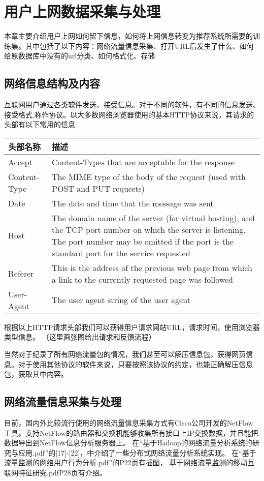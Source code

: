 \chapter{用户上网数据采集与处理}
本章主要介绍用户上网如何留下信息，如何将上网信息转变为推荐系统所需要的训练集。其中包括了以下内容：网络流量信息采集、打开URL后发生了什么、如何给原数据库中没有的url分类、如何格式化、存储
\section{网络信息结构及内容}
互联网用户通过各类软件发送、接受信息。对于不同的软件，有不同的信息发送、接受格式,称作协议。以大多数网络浏览器使用的基本HTTP协议来说，其请求的头部有以下常用的信息 \\
\begin{center}
\begin{tabular}{l|p{10cm}}
 \hline
头部名称 & 描述 \\ \hline
Accept & Content-Types that are acceptable for the response \\ \hline
Content-Type & The MIME type of the body of the request (used with POST and PUT requests) \\ \hline
Date & The date and time that the message was sent \\ \hline
Host & The domain name of the server (for virtual hosting), and the TCP port number on which the server is listening. The port number may be omitted if the port is the standard port for the service requested \\ \hline
Referer & This is the address of the previous web page from which a link to the currently requested page was followed \\ \hline
User-Agent & The user agent string of the user agent \\
\hline
\end{tabular}
\end{center}

根据以上HTTP请求头部我们可以获得用户请求网站URL，请求时间，使用浏览器类型信息。
（这里画张图给出请求和反馈流程）

当然对于纪录了所有网络流量包的情况，我们甚至可以解压信息包，获得网页信息。对于使用其他协议的软件来说，只要按照该协议的约定，也能正确解压信息包，获取其中内容。
\section{网络流量信息采集与处理}
目前，国内外比较流行使用的网络流量信息采集方式有Cisco公司开发的NetFlow工具。支持NetFlow的路由器和交换机能够收集所有接口上IP交换数据，并且能把数据导出到NetFlow信息分析服务器上。
在“基于Hadoop的网络流量分析系统的研究与应用.pdf”的[17]-[22]，中介绍了一些分布式网络流量分析系统实现。
在“基于流量监测的网络用户行为分析.pdf”的P22页有插图，
基于网络流量监测的移动互联网特征研究.pdfP28页有介绍。

